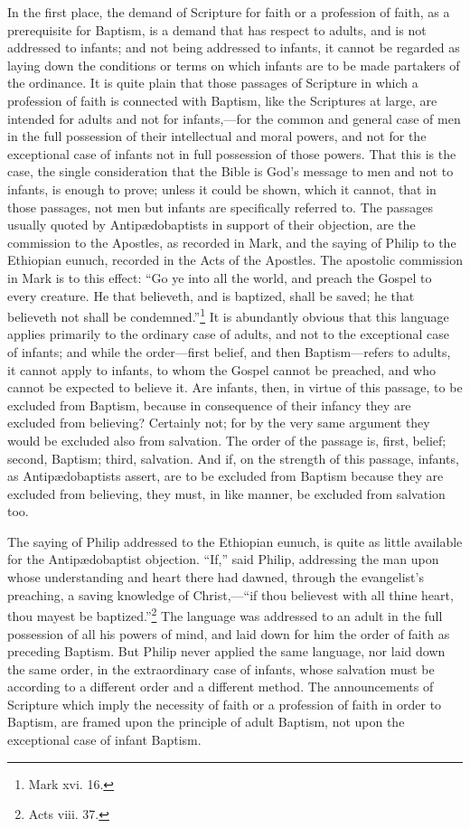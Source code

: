 \documentclass[]{book}
\begin{document}
In the first place, the demand of Scripture for faith or a profession of faith, as a prerequisite for Baptism, is a demand that has respect to adults, and is not addressed to infants; and not being addressed to infants, it cannot be regarded as laying down the conditions or terms on which infants are to be made partakers of the ordinance. It is quite plain that those passages of Scripture in which a profession of faith is connected with Baptism, like the Scriptures at large, are intended for adults and not for infants,---for the common and general case of men in the full possession of their intellectual and moral powers, and not for the exceptional case of infants not in full possession of those powers. That this is the case, the single consideration that the Bible is God's message to men and not to infants, is enough to prove; unless it could be shown, which it cannot, that in those passages, not men but infants are specifically referred to. The passages usually quoted by Antipædobaptists in support of their objection, are the commission to the Apostles, as recorded in Mark, and the saying of Philip to the Ethiopian eunuch, recorded in the Acts of the Apostles. The apostolic commission in Mark is to this effect: ``Go ye into all the world, and preach the Gospel to every creature. He that believeth, and is baptized, shall be saved; he that believeth not shall be condemned.''\footnote{Mark xvi. 16.} It is abundantly obvious that this language applies primarily to the ordinary case of adults, and not to the exceptional case of infants; and while the order---first belief, and then Baptism---refers to adults, it cannot apply to infants, to whom the Gospel cannot be preached, and who cannot be expected to believe it. Are infants, then, in virtue of this passage, to be excluded from Baptism, because in consequence of their infancy they are excluded from believing? Certainly not; for by the very same argument they would be excluded also from salvation. The order of the passage is, first, belief; second, Baptism; third, salvation. And if, on the strength of this passage, infants, as Antipædobaptists assert, are to be excluded from Baptism because they are excluded from believing, they must, in like manner, be excluded from salvation too.

The saying of Philip addressed to the Ethiopian eunuch, is quite as little available for the Antipædobaptist objection. ``If,'' said Philip, addressing the man upon whose understanding and heart there had dawned, through the evangelist's preaching, a saving knowledge of Christ,---``if thou believest with all thine heart, thou mayest be baptized.''\footnote{Acts viii. 37.} The language was addressed to an adult in the full possession of all his powers of mind, and laid down for him the order of faith as preceding Baptism. But Philip never applied the same language, nor laid down the same order, in the extraordinary case of infants, whose salvation must be according to a different order and a different method. The announcements of Scripture which imply the necessity of faith or a profession of faith in order to Baptism, are framed upon the principle of adult Baptism, not upon the exceptional case of infant Baptism.
\end{document}
